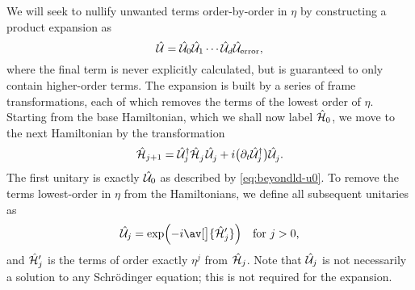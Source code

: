 We will seek to nullify unwanted terms order-by-order in $\eta$ by constructing a product expansion as%
\begin{equation}
\hat{\mathcal U} = \hat{\mathcal U}_0\hat{\mathcal U}_1\dotsm\hat{\mathcal U}_d\hat{\mathcal U}_{\text{error}},
\end{equation}
where the final term is never explicitly calculated, but is guaranteed to only contain higher-order terms.
The expansion is built by a series of frame transformations, each of which removes the terms of the lowest order of $\eta$.
Starting from the base Hamiltonian, which we shall now label $\hat{\mathcal H}_0$, we move to the next Hamiltonian by the transformation
\begin{equation}\label{eq:beyondld-next-hamiltonian-exponentials}
\H_{j+1} = \U_j^{\smash\dagger} \H_j^{\smash{\vphantom\dagger}}\mkern2mu\U_j^{\smash{\vphantom\dagger}} + i\bigl(\partial_t \U_j^{\smash\dagger}\bigr)\U_j^{\smash{\vphantom\dagger}}.
\end{equation}
The first unitary is exactly $\hat{\mathcal U}_0$ as described by \cref{eq:beyondld-u0}.
To remove the terms lowest-order in $\eta$ from the Hamiltonians, we define all subsequent unitaries as
\begin{equation}
\U_j = \exp\Bigl(-i\av[\big]{\H_j'}\Bigr) \quad\text{for $j>0$,}
\end{equation}
and $\hat{\mathcal H}_j'$ is the terms of order exactly $\eta^j$ from $\hat{\mathcal H}_j$.
Note that $\hat{\mathcal U}_j$ is not necessarily a solution to any Schr\"odinger equation; this is not required for the expansion.

